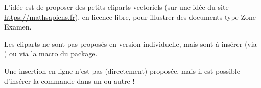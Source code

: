 \begin{tipblock}
 L'idée est de proposer des petits cliparts vectoriels (sur une idée du site \url{https://mathsapiens.fr}), en licence libre, pour illustrer des documents type \textsf{Zone Examen}.

Les cliparts ne sont pas proposés en version individuelle, mais sont à insérer (via ) ou via la macro du package.

\smallskip

Une insertion en ligne n'est pas (directement) proposée, mais il est possible d'insérer la commande dans un  ou autre !
\end{tipblock}

\newcommand\affpictobwtblr[1]{$\vcenter{\hbox{\pflpictobac*[height=0.75cm]{#1}}}$}
\newcommand\affpictocoltblr[1]{$\vcenter{\hbox{\pflpictobac[height=0.75cm]{#1}}}$}

